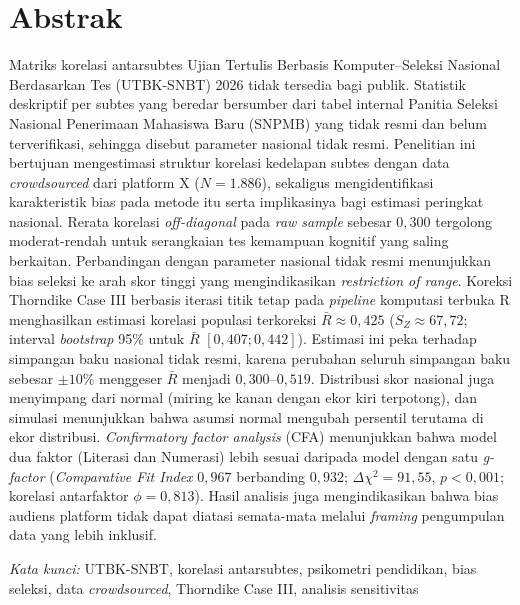 
\section*{Abstrak}
\noindent
Matriks korelasi antarsubtes Ujian Tertulis Berbasis Komputer--Seleksi Nasional Berdasarkan Tes (UTBK-SNBT) 2026 tidak tersedia bagi publik. Statistik deskriptif per subtes yang beredar bersumber dari tabel internal Panitia Seleksi Nasional Penerimaan Mahasiswa Baru (SNPMB) yang tidak resmi dan belum terverifikasi, sehingga disebut parameter nasional tidak resmi. Penelitian ini bertujuan mengestimasi struktur korelasi kedelapan subtes dengan data \textit{crowdsourced} dari platform X ($N = 1.886$), sekaligus mengidentifikasi karakteristik bias pada metode itu serta implikasinya bagi estimasi peringkat nasional. Rerata korelasi \textit{off-diagonal} pada \textit{raw sample} sebesar $0,300$ tergolong moderat-rendah untuk serangkaian tes kemampuan kognitif yang saling berkaitan. Perbandingan dengan parameter nasional tidak resmi menunjukkan bias seleksi ke arah skor tinggi yang mengindikasikan \textit{restriction of range}. Koreksi Thorndike Case III berbasis iterasi titik tetap pada \textit{pipeline} komputasi terbuka R menghasilkan estimasi korelasi populasi terkoreksi $\bar{R} \approx 0,425$ ($S_Z \approx 67,72$; interval \textit{bootstrap} 95\% untuk $\bar{R}$ $[0,407; 0,442]$). Estimasi ini peka terhadap simpangan baku nasional tidak resmi, karena perubahan seluruh simpangan baku sebesar $\pm 10\%$ menggeser $\bar{R}$ menjadi $0,300$--$0,519$. Distribusi skor nasional juga menyimpang dari normal (miring ke kanan dengan ekor kiri terpotong), dan simulasi menunjukkan bahwa asumsi normal mengubah persentil terutama di ekor distribusi. \textit{Confirmatory factor analysis} (CFA) menunjukkan bahwa model dua faktor (Literasi dan Numerasi) lebih sesuai daripada model dengan satu \textit{g-factor} (\textit{Comparative Fit Index} $0,967$ berbanding $0,932$; $\Delta\chi^2 = 91,55$, $p < 0,001$; korelasi antarfaktor $\phi = 0,813$). Hasil analisis juga mengindikasikan bahwa bias audiens platform tidak dapat diatasi semata-mata melalui \textit{framing} pengumpulan data yang lebih inklusif.

\textit{Kata kunci:} UTBK-SNBT, korelasi antarsubtes, psikometri pendidikan, bias seleksi, data \textit{crowdsourced}, Thorndike Case III, analisis sensitivitas

\newpage

